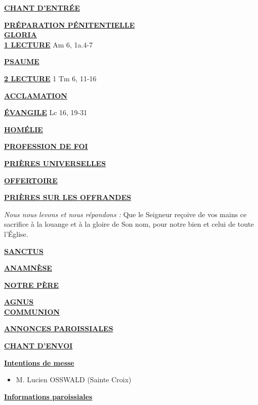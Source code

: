 \documentclass[french,11pt]{article}
\newcommand*{\chants}{../chants}
\newcommand*{\messe}{../messe_du_peuple_de_dieu}
\newcommand*{\pu}{../pu}
\newcommand*{\psaumes}{../psaumes}
\newcommand{\NewsItem}[1]{%
\vspace{3pt}
\underline{\textbf{#1}}
		  }
\begin{document}
\NewsItem{CHANT D'ENTRÉE}
	

\NewsItem{PRÉPARATION PÉNITENTIELLE}\\
	

\NewsItem{GLORIA}\\
	


\NewsItem{1\iere{} LECTURE} Am 6, 1a.4-7

\NewsItem{PSAUME}


\NewsItem{2\ieme{} LECTURE} 1 Tm 6, 11-16

\NewsItem{ACCLAMATION}


\NewsItem{ÉVANGILE} Lc 16, 19-31

\NewsItem{HOMÉLIE}

\NewsItem{PROFESSION DE FOI}
%


\NewsItem{PRIÈRES UNIVERSELLES}


\NewsItem{OFFERTOIRE}

\NewsItem{PRIÈRES SUR LES OFFRANDES}
\textit{Nous nous levons et nous répondons : }
Que le Seigneur reçoive de vos mains ce sacrifice à la louange et à la gloire
de Son nom, pour notre bien et celui de toute l’Église.


\NewsItem{SANCTUS}


\NewsItem{ANAMNÈSE}


\NewsItem{NOTRE PÈRE}

\NewsItem{AGNUS} \\


\NewsItem{COMMUNION}


\NewsItem{ANNONCES PAROISSIALES}


\NewsItem{CHANT D'ENVOI}


\newpage

\NewsItem{Intentions de messe}
\begin{itemize}
\item[\Cross] M. Lucien OSSWALD (Sainte Croix)
\end{itemize}

\NewsItem{Informations paroissiales}
\end{document}
